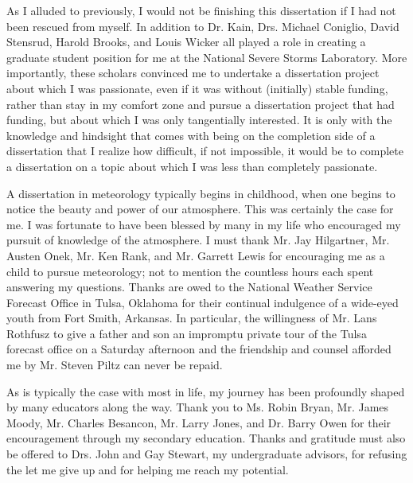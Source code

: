 As I alluded to previously, I would not be finishing this dissertation if I had not been rescued from myself.
In addition to Dr. Kain, Drs. Michael Coniglio, David Stensrud, Harold Brooks, and Louis Wicker all played a role in creating a graduate student position for me at the National Severe Storms Laboratory.
More importantly, these scholars convinced me to undertake a dissertation project about which I was passionate, even if it was without (initially) stable funding, rather than stay in my comfort zone and pursue a dissertation project that had funding, but about which I was only tangentially interested.
It is only with the knowledge and hindsight that comes with being on the completion side of a dissertation that I realize how difficult, if not impossible, it would be to complete a dissertation on a topic about which I was less than completely passionate.


A dissertation in meteorology typically begins in childhood, when one begins to notice the beauty and power of our atmosphere.
This was certainly the case for me.
I was fortunate to have been blessed by many in my life who encouraged my pursuit of knowledge of the atmosphere.
I must thank Mr. Jay Hilgartner, Mr. Austen Onek, Mr. Ken Rank, and Mr. Garrett Lewis for encouraging me as a child to pursue meteorology; not to mention the countless hours each spent answering my questions.
Thanks are owed to the National Weather Service Forecast Office in Tulsa, Oklahoma for their continual indulgence of a wide-eyed youth from Fort Smith, Arkansas.
In particular, the willingness of Mr. Lans Rothfusz to give a father and son an impromptu private tour of the Tulsa forecast office on a Saturday afternoon and the friendship and counsel afforded me by Mr. Steven Piltz can never be repaid.


As is typically the case with most in life, my journey has been profoundly shaped by many educators along the way.
Thank you to Ms. Robin Bryan, Mr. James Moody, Mr. Charles Besancon, Mr. Larry Jones, and Dr. Barry Owen for their encouragement through my secondary education.
Thanks and gratitude must also be offered to Drs. John and Gay Stewart, my undergraduate advisors, for refusing the let me give up and for helping me reach my potential.


